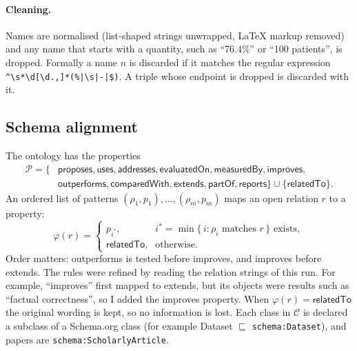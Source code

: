 \documentclass[11pt]{article}
\newcommand{\code}[1]{\texttt{#1}}
\newcommand{\prop}[1]{\textsf{#1}}
\begin{document}
\paragraph{Cleaning.} Names are normalised (list-shaped strings unwrapped, LaTeX markup removed) and any name that starts with a quantity, such as ``76.4\%'' or ``100 patients'', is dropped. Formally a name $n$ is discarded if it matches the regular expression \verb!^\s*\d[\d.,]*(%|\s|-|$)!. A triple whose endpoint is dropped is discarded with it.

\subsection{Schema alignment}\label{sec:align}
The ontology has the properties
\begin{equation}
\begin{aligned}
\mathcal{P} = \{&\prop{proposes}, \prop{uses}, \prop{addresses}, \prop{evaluatedOn}, \prop{measuredBy}, \prop{improves},\\
&\prop{outperforms}, \prop{comparedWith}, \prop{extends}, \prop{partOf}, \prop{reports}\} \cup \{\prop{relatedTo}\}.
\end{aligned}
\end{equation}
An ordered list of patterns $(\rho_1,p_1),\dots,(\rho_m,p_m)$ maps an open relation $r$ to a property:
\begin{equation}
  \varphi(r) = \begin{cases} p_{i^*}, & i^* = \min\{\,i : \rho_i \text{ matches } r\,\} \text{ exists},\\ \prop{relatedTo}, & \text{otherwise.}\end{cases}
\end{equation}
Order matters: \prop{outperforms} is tested before \prop{improves}, and \prop{improves} before \prop{extends}. The rules were refined by reading the relation strings of this run. For example, ``improves'' first mapped to \prop{extends}, but its objects were results such as ``factual correctness'', so I added the \prop{improves} property. When $\varphi(r)=\prop{relatedTo}$ the original wording is kept, so no information is lost. Each class in $\mathcal{C}$ is declared a subclass of a Schema.org class (for example \textsf{Dataset} $\sqsubseteq$ \code{schema:Dataset}), and papers are \code{schema:ScholarlyArticle}.
\end{document}
